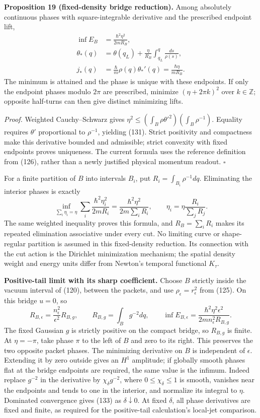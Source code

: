 \documentclass[11pt,a4paper]{article}
\begin{document}
\textbf{Proposition 19 (fixed-density bridge reduction).} Among
absolutely continuous phases with square-integrable derivative and the
prescribed endpoint lift, \[\begin{aligned}
\inf E_B&=\frac{\hbar^2\eta^2}{2mR_B},\\
\theta_*(q)&=\theta(q_L)+\frac{\eta}{R_B}
                  \int_{q_L}^{q}\frac{ds}{\rho(s)},\\
j_*(q)&=\frac{\hbar}{m}\rho(q)\theta_*'(q)
                   =\frac{\hbar\eta}{mR_B}.
\end{aligned}\tag{131}\] The minimum is attained and the phase is unique
with these endpoints. If only the endpoint phases modulo \(2\pi\) are
prescribed, minimize \((\eta+2\pi k)^2\) over \(k\in\mathbb Z\);
opposite half-turns can then give distinct minimizing lifts.

\emph{Proof.} Weighted Cauchy--Schwarz gives
\(\eta^2\le(\int_B\rho\theta'^2)(\int_B\rho^{-1})\). Equality requires
\(\theta'\) proportional to \(\rho^{-1}\), yielding (131). Strict
positivity and compactness make this derivative bounded and admissible;
strict convexity with fixed endpoints proves uniqueness. The current
formula uses the reference definition from (126), rather than a newly
justified physical momentum readout. \(\square\)

For a finite partition of \(B\) into intervals \(B_i\), put
\(R_i=\int_{B_i}\rho^{-1}dq\). Eliminating the interior phases is
exactly \[\inf_{\sum_i\eta_i=\eta}\sum_i\frac{\hbar^2\eta_i^2}{2mR_i}
 =\frac{\hbar^2\eta^2}{2m\sum_iR_i},\qquad
\eta_i=\eta\frac{R_i}{\sum_jR_j}.\tag{132}\] The same weighted
inequality proves this formula, and \(R_B=\sum_iR_i\) makes its repeated
elimination associative under every cut. No limiting curve or
shape-regular partition is assumed in this fixed-density reduction. Its
connection with the cut action is the Dirichlet minimization mechanism;
the spatial density weight and energy units differ from Newton's
temporal functional \(K_\tau\).

\textbf{Positive-tail limit with its sharp coefficient.} Choose \(B\)
strictly inside the vacuum interval of (120), between the packets, and
use \(\rho_\epsilon=r_\epsilon^2\) from (125). On this bridge \(u=0\),
so \[R_{B,\epsilon}=\frac{n_\epsilon^2}{\epsilon^2}R_{B,g},
\qquad R_{B,g}=\int_Bg^{-2}dq,
\qquad \inf E_{B,\epsilon}
 =\frac{\hbar^2\eta^2\epsilon^2}{2mn_\epsilon^2R_{B,g}}.
\tag{133}\] The fixed Gaussian \(g\) is strictly positive on the compact
bridge, so \(R_{B,g}\) is finite. At \(\eta=-\pi\), take phase \(\pi\)
to the left of \(B\) and zero to its right. This preserves the two
opposite packet phases. The minimizing derivative on \(B\) is
independent of \(\epsilon\). Extending it by zero outside gives an
\(H^1\) amplitude; if globally smooth phases flat at the bridge
endpoints are required, the same value is the infimum. Indeed replace
\(g^{-2}\) in the derivative by \(\chi_\delta g^{-2}\), where
\(0\le\chi_\delta\le1\) is smooth, vanishes near the endpoints and tends
to one in the interior, and normalize its integral to \(\eta\).
Dominated convergence gives (133) as \(\delta\downarrow0\). At fixed
\(\delta\), all phase derivatives are fixed and finite, as required for
the positive-tail calculation's local-jet comparison.
\end{document}
